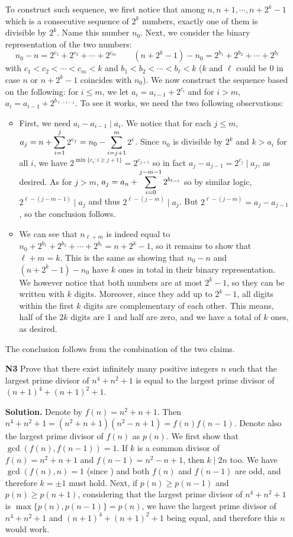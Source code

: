 \documentclass[11pt,a4paper]{article}
\begin{document}
\begin{enumerate}
	To construct such sequence, we first notice that among $n, n+1, \cdots , n+2^k-1$ which is a consecutive sequence of $2^k$ numbers, exactly one of them is divisible by $2^k$. Name this number $n_0$. Next, we consider the binary representation of the two numbers:
	\[n_0-n=2^{c_1}+2^{c_2}+\cdots + 2^{c_m}\qquad
	(n+2^k-1)-n_0=2^{b_1}+2^{b_2}+\cdots + 2^{b_\ell}
	\]
	with $c_1<c_2<\cdots < c_m<k$ and $b_1<b_2<\cdots < b_{\ell}<k$ ($k$ and $\ell$ could be 0 in case $n$ or $n+2^k-1$ coincides with $n_0$). We now construct the sequence based on the following: for $i\le m$, we let $a_i=a_{i-1}+2^{c_i}$ and for $i> m$, $a_i=a_{i-1}+2^{b_{\ell-i-1}}.$ To see it works, we need the two following observations:
	\begin{itemize}
		\item First, we need $a_i-a_{i-1}\mid a_i$. We notice that for each $j\le m$, $a_j=n+\dsum_{i=1}^j 2^{c_j}=n_0-\dsum_{i=j+1}^m 2^i$. 
		Since $n_0$ is divisible by $2^k$ and $k>a_i$ for all $i$, we have $2^{\min\{c_i: i\ge j+1\}}=2^{c_{j+1}}$ so in fact $a_j-a_{j-1}=2^{c_j}\mid a_j$, as desired. 
		As for $j>m$, $a_j=a_n+\dsum_{i=0}^{j-m-1} 2^{b_{\ell-i}}$ so by similar logic, 
		$2^{\ell-(j-m-1)}\mid a_j$ and thus $2^{\ell-(j-m)}\mid a_j$. But $2^{\ell-(j-m)}=a_j-a_{j-1}$, so the conclusion follows. 
		
		\item We can see that $n_{\ell+m}$ is indeed equal to $n_0+2^{b_1}+2^{b_2}+\cdots + 2^{b_\ell}=n+2^k-1$, so it remains to show that $\ell+m=k$. 
		This is the same as showing that $n_0-n$ and $(n+2^k-1)-n_0$ have $k$ ones in total in their binary representation. We however notice that both numbers are at most $2^k-1$, so they can be written with $k$ digits. Moreover, since they add up to $2^k-1$, all digits within the first $k$ digits are complementary of each other. This means, half of the $2k$ digits are 1 and half are zero, and we have a total of $k$ ones, as desired. 
		
	\end{itemize}
	The conclusion follows from the combination of the two claims. 
	
	
	\item[\textbf{N3}] Prove that there exist infinitely many positive integers $n$ such that the largest prime divisor of $n^4 + n^2 + 1$ is equal to the largest prime divisor of $(n+1)^4 + (n+1)^2 +1$.
	
	\textbf{Solution.} Denote by $f(n)=n^2+n+1$. Then $n^4+n^2+1=(n^2+n+1)(n^2-n+1)=f(n)f(n-1)$. Denote also the largest prime divisor of $f(n)$ as $p(n)$. We first show that $\gcd(f(n), f(n-1))=1$. 
	If $k$ is a common divisor of $f(n)=n^2+n+1$ and $f(n-1)=n^2-n+1$, then $k\mid 2n$ too. 
	We have $\gcd(f(n), n)=1$ (since ) and both $f(n)$ and $f(n-1)$ are odd, and therefore $k=\pm 1$ must hold. 
	Next, if $p(n)\ge p(n-1)$ and $p(n)\ge p(n+1)$, considering that the largest prime divisor of $n^4+n^2+1$ is $\max\{p(n), p(n-1)\}=p(n)$, we have the largest prime divisor of $n^4+n^2+1$ and $(n+1)^4+(n+1)^2+1$ being equal, and therefore this $n$ would work. 
	

\end{enumerate}
\end{document}
